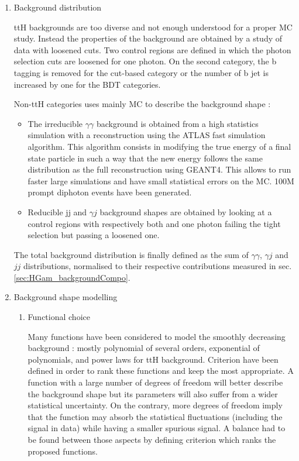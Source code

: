\begin{enumerate}
\item Background distribution
  \label{sec:orge7b221f}

ttH backgrounds are too diverse and not enough understood for a proper MC study.
Instead the properties of the background are obtained by a study of data with loosened cuts.
Two control regions are defined in which the photon selection cuts are loosened for one photon.
On the second category, the b tagging is removed for the cut-based category or the number of b jet is increased by one for the BDT categories.

Non-ttH categories uses mainly MC to describe the background shape :
\begin{itemize}
\item The irreducible $\gamma \gamma$ background is obtained from a high statistics simulation with a reconstruction using the ATLAS fast simulation algorithm.
This algorithm consists in modifying the true energy of a final state particle in such a way that the new energy follows the same distribution as the full reconstruction using GEANT4.
This allows to run faster large simulations and have small statistical errors on the MC.
100M prompt diphoton events have been generated.

\item Reducible jj and $\gamma j$ background shapes are obtained by looking at a control regions with respectively both and one photon failing the tight selection but passing a loosened one.

\end{itemize}

The total background distribution is finally defined as the sum of $\gamma\gamma$, $\gamma j$ and $jj$  distributions, normalised to their respective contributions measured in sec. \ref{sec:HGam_backgroundCompo}.

\item Background shape modelling
\label{sec:orgfec0702}

\begin{enumerate}
\item Functional choice
  \label{sec:org56079de}

Many functions have been considered to model the smoothly decreasing background : mostly polynomial of several orders,  exponential of polynomials, and power laws for ttH background.
Criterion have been defined in order to rank these functions and keep the most appropriate.
A function with a large number of degrees of freedom will better describe the background shape but its parameters will also suffer from a wider statistical uncertainty.
On the contrary, more degrees of freedom imply that the function may absorb the statistical fluctuations (including the signal in data) while having a smaller spurious signal.
A balance had to be found between those aspects by defining criterion which ranks the proposed functions.


\end{enumerate}
\end{enumerate}
